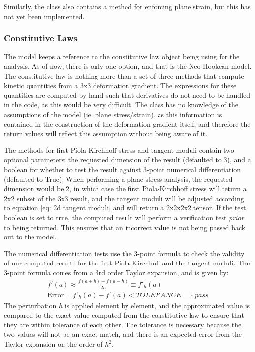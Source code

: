 \documentclass[]{spie}  %
\begin{document}
Similarly, the class also contains a method for enforcing plane strain, but this has not yet been implemented. 

\subsubsection{Constitutive Laws}
The model keeps a reference to the constitutive law object being using for the analysis. As of now, there is only one option, and that is the Neo-Hookean model. The constitutive law is nothing more than a set of three methods that compute kinetic quantities from a 3x3 deformation gradient. The expressions for these quantities are computed by hand such that derivatives do not need to be handled in the code, as this would be very difficult. The class has no knowledge of the assumptions of the model (ie. plane stress/strain), as this information is contained in the construction of the deformation gradient itself, and therefore the return values will reflect this assumption without being aware of it. 

The methods for first Piola-Kirchhoff stress and tangent moduli contain two optional parameters: the requested dimension of the result (defaulted to 3), and a boolean for whether to test the result against 3-point numerical differentiation (defaulted to True). When performing a plane stress analysis, the requested dimension would be 2, in which case the first Piola-Kirchhoff stress will return a 2x2 subset of the 3x3 result, and the tangent moduli will be adjusted according to equation \ref{eq: 2d tangent moduli} and will return a 2x2x2x2 tensor. If the test boolean is set to true, the computed result will perform a verification test \textit{prior} to being returned. This ensures that an incorrect value is not being passed back out to the model. 

The numerical differentiation tests use the 3-point formula to check the validity of our computed results for the first Piola-Kirchhoff and the tangent moduli. The 3-point formula comes from a 3rd order Taylor expansion, and is given by:
\begin{gather}
\label{eq: 3 point formula}
f'(a) \approx \frac{f(a + h) - f(a - h)}{2h} \equiv f'_h(a) \\[1ex]
\textrm{Error} = f'_h(a) - f'(a) < TOLERANCE \implies pass
\end{gather}
The perturbation $h$ is applied element by element, and the approximated value is compared to the exact value computed from the constitutive law to ensure that they are within tolerance of each other. The tolerance is necessary because the two values will not be an exact match, and there is an expected error from the Taylor expansion on the order of $h^2$. 
\end{document}
